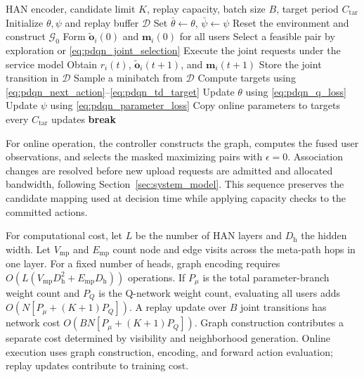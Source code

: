 \begin{algorithm}[t]
\caption{HAN--PDQN Training}
\label{alg:han_pdqn_training}
\begin{algorithmic}[1]
\Require HAN encoder, candidate limit $K$, replay capacity,
batch size $B$, target period $C_{\mathrm{tar}}$
\State Initialize $\theta,\psi$ and replay buffer $\mathcal{D}$
\State Set $\bar{\theta}\gets\theta$, $\bar{\psi}\gets\psi$
    \State Reset the environment and construct $\mathcal{G}_0$
    \State Form $\widetilde{\mathbf{o}}_i(0)$ and
    $\mathbf{m}_i(0)$ for all users
            \State Select a feasible pair by exploration or
            \eqref{eq:pdqn_joint_selection}
        \EndFor
        \State Execute the joint requests under the service model
        \State Obtain $r_i(t)$, $\widetilde{\mathbf{o}}_i(t+1)$,
        and $\mathbf{m}_i(t+1)$
        \State Store the joint transition in $\mathcal{D}$
            \State Sample a minibatch from $\mathcal{D}$
            \State Compute targets using
            \eqref{eq:pdqn_next_action}--\eqref{eq:pdqn_td_target}
            \State Update $\theta$ using \eqref{eq:pdqn_q_loss}
            \State Update $\psi$ using \eqref{eq:pdqn_parameter_loss}
            \State Copy online parameters to targets every
            $C_{\mathrm{tar}}$ updates
        \EndIf
            \State \textbf{break}
        \EndIf
    \EndFor
\EndFor
\end{algorithmic}
\end{algorithm}

For online operation, the controller constructs the graph,
computes the fused user observations, and selects the
masked maximizing pairs with $\epsilon=0$.
Association changes are resolved before new upload
requests are admitted and allocated bandwidth, following
Section~\ref{sec:system_model}.
This sequence preserves the candidate mapping used
at decision time while applying capacity checks to
the committed actions.

For computational cost, let $L$ be the number of HAN
layers and $D_{\mathrm h}$ the hidden width.
Let $V_{\mathrm{mp}}$ and $E_{\mathrm{mp}}$ count node
and edge visits across the meta-path hops in one layer.
For a fixed number of heads, graph encoding requires
$O(L(V_{\mathrm{mp}}D_{\mathrm h}^2+
E_{\mathrm{mp}}D_{\mathrm h}))$ operations.
If $P_\mu$ is the total parameter-branch weight count
and $P_Q$ is the Q-network weight count, evaluating all
users adds $O(N[P_\mu+(K+1)P_Q])$.
A replay update over $B$ joint transitions has network cost
$O(BN[P_\mu+(K+1)P_Q])$.
Graph construction contributes a separate cost determined
by visibility and neighborhood generation.
Online execution uses graph construction, encoding,
and forward action evaluation; replay updates contribute
to training cost.
